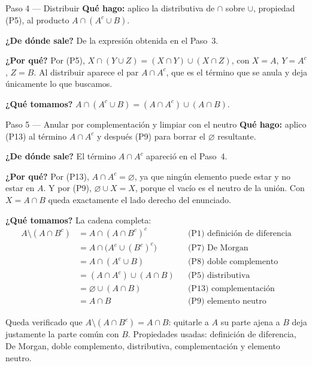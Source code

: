 \documentclass[11pt]{article}
\begin{document}
\begin{paso}{Paso 4 --- Distribuir}
\textbf{Qué hago:} aplico la distributiva de $\cap$ sobre $\cup$, propiedad (P5), al producto
$A\cap(A^{c}\cup B)$.

\textbf{¿De dónde sale?} De la expresión obtenida en el Paso~3.

\textbf{¿Por qué?} Por (P5), $X\cap(Y\cup Z)=(X\cap Y)\cup(X\cap Z)$, con $X=A$, $Y=A^{c}$,
$Z=B$. Al distribuir aparece el par $A\cap A^{c}$, que es el término que se anula y deja
únicamente lo que buscamos.

\textbf{¿Qué tomamos?} $A\cap(A^{c}\cup B)=(A\cap A^{c})\cup(A\cap B)$.
\end{paso}

\begin{paso}{Paso 5 --- Anular por complementación y limpiar con el neutro}
\textbf{Qué hago:} aplico (P13) al término $A\cap A^{c}$ y después (P9) para borrar el
$\varnothing$ resultante.

\textbf{¿De dónde sale?} El término $A\cap A^{c}$ apareció en el Paso~4.

\textbf{¿Por qué?} Por (P13), $A\cap A^{c}=\varnothing$, ya que ningún elemento puede estar y no
estar en $A$. Y por (P9), $\varnothing\cup X=X$, porque el vacío es el neutro de la unión. Con
$X=A\cap B$ queda exactamente el lado derecho del enunciado.

\textbf{¿Qué tomamos?} La cadena completa:
\begin{align*}
A\setminus(A\cap B^{c})
&=A\cap(A\cap B^{c})^{c} && \text{(P1) definición de diferencia}\\
&=A\cap\bigl(A^{c}\cup(B^{c})^{c}\bigr) && \text{(P7) De Morgan}\\
&=A\cap(A^{c}\cup B) && \text{(P8) doble complemento}\\
&=(A\cap A^{c})\cup(A\cap B) && \text{(P5) distributiva}\\
&=\varnothing\cup(A\cap B) && \text{(P13) complementación}\\
&=A\cap B && \text{(P9) elemento neutro}
\end{align*}
\end{paso}

\begin{resp}
Queda verificado que $A\setminus(A\cap B^{c})=A\cap B$: quitarle a $A$ su parte ajena a $B$ deja
justamente la parte común con $B$. Propiedades usadas: definición de diferencia, De Morgan,
doble complemento, distributiva, complementación y elemento neutro.
\end{resp}
\end{document}

